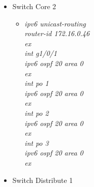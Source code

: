 \documentclass[a4paper, 12pt]{article}
\begin{document}
\begin{itemize}
\begin{itemize}
\begin{itemize}
          \end{itemize}
             \item Switch Core 2
           
        \begin{itemize}
         \item \textit{ipv6 unicast-routing\\
                       router-id 172.16.0.46\\
                        ex\\
                        int g1/0/1\\
                        ipv6 ospf 20 area 0\\
                        ex\\
                        int po 1\\
                        ipv6 ospf 20 area 0\\
                        ex\\
                        int po 2\\
                        ipv6 ospf 20 area 0\\
                        ex\\
                        int po 3\\
                        ipv6 ospf 20 area 0\\
                        ex\\}
        
          \end{itemize}
             \item Switch Distribute 1
           

\end{itemize}
\end{itemize}
\end{document}
